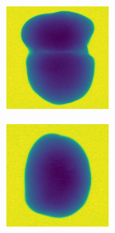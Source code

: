 \documentclass[11pt]{article}
\begin{document}
\begin{figure}[!h]
\begin{subfigure}[b]{0.22\textwidth}
         \caption{}
         \label{fig:perfect_1}
     \end{subfigure}
     \hfill
     \begin{subfigure}[b]{0.22\textwidth}
         \centering
         \includegraphics[width=\textwidth]{figurer/potato_dataset/perfect/perfect_2.jpg}
         \caption{}
         \label{fig:perfect_2}
     \end{subfigure}
     \hfill
     \begin{subfigure}[b]{0.22\textwidth}
         \centering
         \includegraphics[width=\textwidth]{figurer/potato_dataset/perfect/perfect_3.jpg}

\end{subfigure}
\end{figure}
\end{document}
